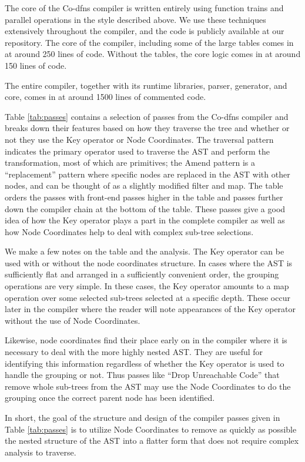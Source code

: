 \documentclass[numbers,preprint]{sigplanconf}
\begin{document}
The core of the Co-dfns compiler is written entirely using function trains 
and parallel operations in the style described above. We use these techniques 
extensively throughout the compiler, and the code is publicly available 
at our repository. The core of the compiler, including some of the large 
tables comes in at around 250 lines of code. Without the tables, the core 
logic comes in at around 150 lines of code. 

The entire compiler, together with its runtime libraries, parser, generator, 
and core, comes in at around 1500 lines of commented code. 

Table \ref{tab:passes} contains a selection of passes from the
Co-dfns compiler and breaks down their features based on how they
traverse the tree and whether or not they use the Key operator or
Node Coordinates.
The traversal pattern indicates the primary operator used to traverse the AST 
and perform the transformation, most of which are primitives; the Amend pattern 
is a ``replacement'' pattern where specific nodes are replaced in the AST with 
other nodes, and can be thought of as a slightly modified filter and map.
The table orders the passes with front-end passes higher in
the table and passes further down the compiler chain at the bottom
of the table. These passes give a good idea of how the Key operator
plays a part in the complete compiler as well as how Node Coordinates
help to deal with complex sub-tree selections.

We make a few notes on the table and the analysis. The Key operator
can be used with or without the node coordinates structure. In cases
where the AST is sufficiently flat and arranged in a sufficiently
convenient order, the grouping operations are very simple. In these
cases, the Key operator amounts to a map operation over some selected
sub-trees selected at a specific depth. These occur later in the
compiler where the reader will note appearances of the Key operator
without the use of Node Coordinates.

Likewise, node coordinates find their place early on in the compiler
where it is necessary to deal with the more highly nested AST. They
are useful for identifying this information regardless of whether the
Key operator is used to handle the grouping or not. Thus passes like
``Drop Unreachable Code'' that remove whole sub-trees from the AST
may use the Node Coordinates to do the grouping once the correct
parent node has been identified.

In short, the goal of the structure and design of the compiler passes
given in Table \ref{tab:passes} is to utilize Node Coordinates to
remove as quickly as possible the nested structure of the AST into
a flatter form that does not require complex analysis to traverse.
\end{document}
